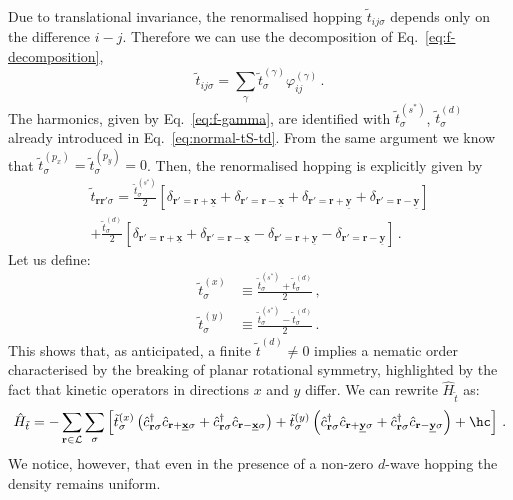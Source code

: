 Due to translational invariance, the renormalised hopping $\tilde{t}_{ij\sigma}$ depends only on the difference $i-j$. Therefore we can use the decomposition of Eq.~\eqref{eq:f-decomposition},
\[
	\tilde{t}_{ij\sigma} = \sum_\gamma \tilde{t}^{(\gamma)}_\sigma \varphi_{ij}^{(\gamma)} \, .
\]
The harmonics, given by Eq.~\eqref{eq:f-gamma}, are identified with $\tilde{t}_\sigma^{(s^*)}$, $\tilde{t}_\sigma^{(d)}$ already introduced in Eq.~\eqref{eq:normal-tS-td}. From the same argument we know that $\tilde{t}_\sigma^{(p_x)}=\tilde{t}_\sigma^{(p_y)}=0$. Then, the renormalised hopping is explicitly given by
\begin{multline*}
	\tilde{t}_{\mathbf{r}\mathbf{r}'\sigma} = \frac{\tilde{t}_\sigma^{(s^*)}}{2} \left[
		\delta_{\mathbf{r}'=\mathbf{r}+\underline{\mathbf{x}}} + \delta_{\mathbf{r}'=\mathbf{r}-\underline{\mathbf{x}}} + \delta_{\mathbf{r}'=\mathbf{r}+\underline{\mathbf{y}}} + \delta_{\mathbf{r}'=\mathbf{r}-\underline{\mathbf{y}}}
	\right] \\
	+ \frac{\tilde{t}_\sigma^{(d)}}{2} \left[
		\delta_{\mathbf{r}'=\mathbf{r}+\underline{\mathbf{x}}} + \delta_{\mathbf{r}'=\mathbf{r}-\underline{\mathbf{x}}} - \delta_{\mathbf{r}'=\mathbf{r}+\underline{\mathbf{y}}} - \delta_{\mathbf{r}'=\mathbf{r}-\underline{\mathbf{y}}}
	\right] \, .
\end{multline*}
Let us define:
\begin{align}
	\tilde{t}_\sigma^{(x)} &\equiv \frac{\tilde{t}_\sigma^{(s^*)} + \tilde{t}_\sigma^{(d)}}{2} \, , \label{eq:normal-tx} \\
	\tilde{t}_\sigma^{(y)} &\equiv \frac{\tilde{t}_\sigma^{(s^*)} - \tilde{t}_\sigma^{(d)}}{2} \, . \label{eq:normal-ty}
\end{align}
This shows that, as anticipated, a finite $\tilde{t}^{(d)} \neq 0$ implies a nematic order characterised by the breaking of planar rotational symmetry, highlighted by the fact that kinetic operators in directions $x$ and $y$ differ. We can rewrite $\hat H_{\tilde{t}}$ as:
\[
	\hat H_{\tilde{t}} = - \sum_{\mathbf{r}\in\mathcal{L}} \sum_\sigma \left[
		\tilde{t}_\sigma^{(x)} \left(
			\hat c_{\mathbf{r}\sigma}^\dagger \hat c_{\mathbf{r}+\underline{\mathbf{x}}\sigma} + \hat c_{\mathbf{r}\sigma}^\dagger \hat c_{\mathbf{r}-\underline{\mathbf{x}}\sigma}
		\right) + \tilde{t}_\sigma^{(y)} \left(
			\hat c_{\mathbf{r}\sigma}^\dagger \hat c_{\mathbf{r}+\underline{\mathbf{y}}\sigma} + \hat c_{\mathbf{r}\sigma}^\dagger \hat c_{\mathbf{r}-\underline{\mathbf{y}}\sigma}
		\right) + \hc
	\right] \, .
\]
We notice, however, that even in the presence of a non-zero $d$-wave hopping the density remains uniform.


